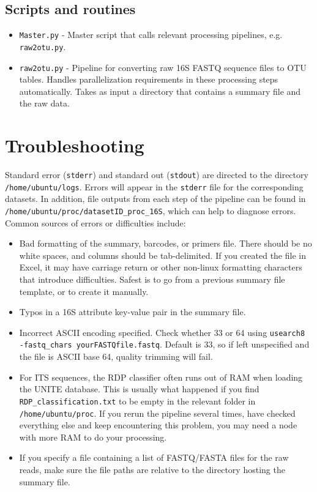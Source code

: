 \documentclass[11pt, oneside]{article}   	%
\begin{document}
\subsection{Scripts and routines}
\begin{itemize}
	\item {\tt Master.py} - Master script that calls relevant processing pipelines, e.g. {\tt raw2otu.py}.
	\item {\tt raw2otu.py} - Pipeline for converting raw 16S FASTQ sequence files to OTU tables.  Handles parallelization requirements in these processing steps automatically.  Takes as input a directory that contains a summary file and the raw data.
\end{itemize}

\section{Troubleshooting}
Standard error ({\tt stderr}) and standard out ({\tt stdout}) are directed to the directory {\tt /home/ubuntu/logs}.  Errors will appear in the {\tt stderr} file for the corresponding datasets.  In addition, file outputs from each step of the pipeline can be found in {\tt /home/ubuntu/proc/datasetID\_proc\_16S}, which can help to diagnose errors.  Common sources of errors or difficulties include:

\begin{itemize}
\item Bad formatting of the summary, barcodes, or primers file.  There should be no white spaces, and columns should be tab-delimited.  If you created the file in Excel, it may have carriage return or other non-linux formatting characters that introduce difficulties.  Safest is to go from a previous summary file template, or to create it manually.
\item Typos in a 16S attribute key-value pair in the summary file.
\item Incorrect ASCII encoding specified.  Check whether 33 or 64 using {\tt usearch8 -fastq\_chars yourFASTQfile.fastq}.  Default is 33, so if left unspecified and the file is ASCII base 64, quality trimming will fail.
\item For ITS sequences, the RDP classifier often runs out of RAM when loading the UNITE database.  This is usually what happened if you find {\tt RDP\_classification.txt} to be empty in the relevant folder in {\tt /home/ubuntu/proc}.  If you rerun the pipeline several times, have checked everything else and keep encountering this problem, you may need a node with more RAM to do your processing.
\item If you specify a file containing a list of FASTQ/FASTA files for the raw reads, make sure the file paths are relative to the directory hosting the summary file.
\end{itemize}
\end{document}
